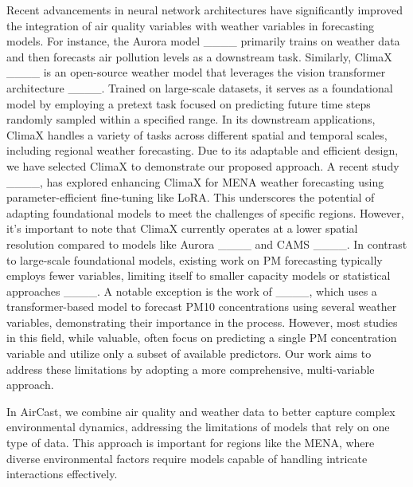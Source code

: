 Recent advancements in neural network architectures have significantly improved the integration of air quality variables with weather variables in forecasting models. 
For instance, the Aurora model ____ primarily trains on weather data and then forecasts air pollution levels as a downstream task.
Similarly, ClimaX ____ is an open-source weather model that leverages the vision transformer architecture ____. 
Trained on large-scale datasets, it serves as a foundational model by employing a pretext task focused on predicting future time steps randomly sampled within a specified range. 
In its downstream applications, ClimaX handles a variety of tasks across different spatial and temporal scales, including regional weather forecasting. Due to its adaptable and efficient design, we have selected ClimaX to demonstrate our proposed approach. 
A recent study ____, has explored enhancing ClimaX for MENA weather forecasting using parameter-efficient fine-tuning like LoRA. This underscores the potential of adapting foundational models to meet the challenges of specific regions.
However, it's important to note that ClimaX currently operates at a lower spatial resolution compared to models like Aurora ____ and CAMS ____. In contrast to large-scale foundational models, existing work on PM forecasting typically employs fewer variables, limiting itself to smaller capacity models or statistical approaches ____. A notable exception is the work of ____, which uses a transformer-based model to forecast PM10 concentrations using several weather variables, demonstrating their importance in the process. However, most studies in this field, while valuable, often focus on predicting a single PM concentration variable and utilize only a subset of available predictors. Our work aims to address these limitations by adopting a more comprehensive, multi-variable approach.

In AirCast, we combine air quality and weather data to better capture complex environmental dynamics, addressing the limitations of models that rely on one type of data. This approach is important for regions like the MENA, where diverse environmental factors require models capable of handling intricate interactions effectively.

